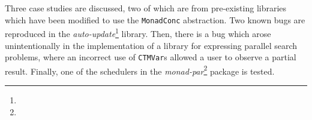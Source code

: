 Three case studies are discussed, two of which are from pre-existing
libraries which have been modified to use the \verb|MonadConc|
abstraction. Two known bugs are reproduced in the
\emph{auto-update}\footnote{} library. Then,
there is a bug which arose unintentionally in the implementation of a
library for expressing parallel search problems, where an incorrect
use of \verb|CTMVar|s allowed a user to observe a partial
result. Finally, one of the schedulers in the
\emph{monad-par}\footnote{} package is tested.
